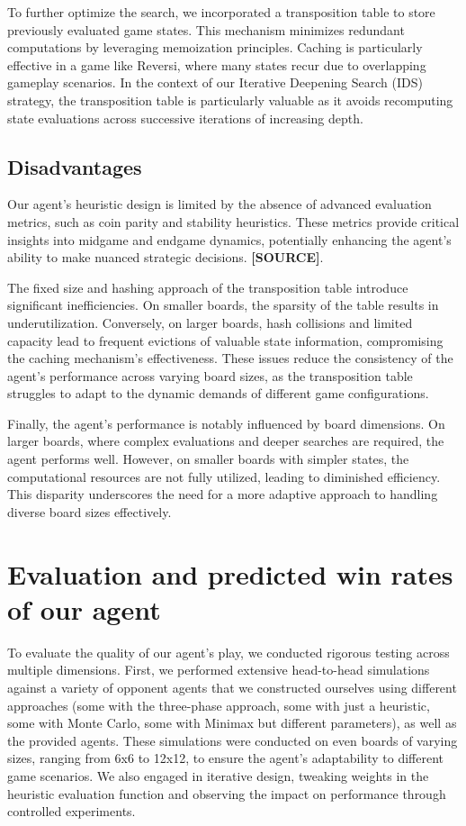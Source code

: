 \documentclass[11pt]{article}
\begin{document}
To further optimize the search, we incorporated a transposition table to store previously evaluated game states. This mechanism minimizes redundant computations by leveraging memoization principles. Caching is particularly effective in a game like Reversi, where many states recur due to overlapping gameplay scenarios. In the context of our Iterative Deepening Search (IDS) strategy, the transposition table is particularly valuable as it avoids recomputing state evaluations across successive iterations of increasing depth.

\subsection*{Disadvantages}
Our agent's heuristic design is limited by the absence of advanced evaluation metrics, such as coin parity and stability heuristics. These metrics provide critical insights into midgame and endgame dynamics, potentially enhancing the agent's ability to make nuanced strategic decisions. \textbf{[SOURCE]}.

The fixed size and hashing approach of the transposition table introduce significant inefficiencies. On smaller boards, the sparsity of the table results in underutilization. Conversely, on larger boards, hash collisions and limited capacity lead to frequent evictions of valuable state information, compromising the caching mechanism's effectiveness. These issues reduce the consistency of the agent's performance across varying board sizes, as the transposition table struggles to adapt to the dynamic demands of different game configurations.

Finally, the agent's performance is notably influenced by board dimensions. On larger boards, where complex evaluations and deeper searches are required, the agent performs well. However, on smaller boards with simpler states, the computational resources are not fully utilized, leading to diminished efficiency. This disparity underscores the need for a more adaptive approach to handling diverse board sizes effectively.


\section*{Evaluation and predicted win rates of our agent}

To evaluate the quality of our agent's play, we conducted rigorous testing across multiple dimensions. First, we performed extensive head-to-head simulations against a variety of opponent agents that we constructed ourselves using different approaches (some with the three-phase approach, some with just a heuristic, some with Monte Carlo, some with Minimax but different parameters), as well as the provided agents. These simulations were conducted on even boards of varying sizes, ranging from 6x6 to 12x12, to ensure the agent's adaptability to different game scenarios. We also engaged in iterative design, tweaking weights in the heuristic evaluation function and observing the impact on performance through controlled experiments.
\end{document}
